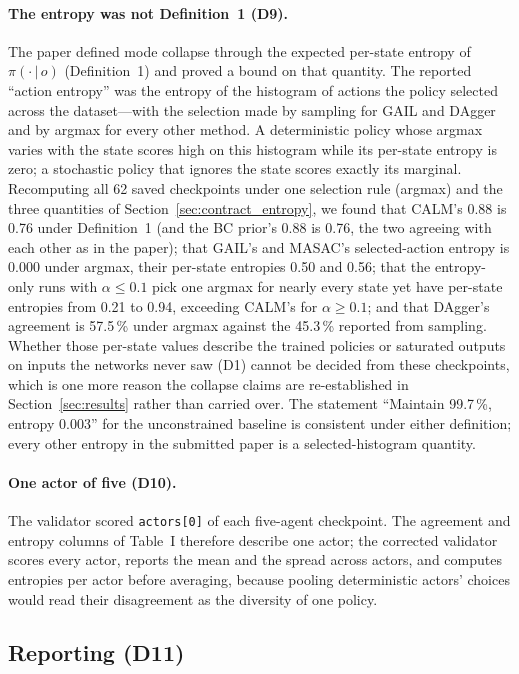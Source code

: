 \paragraph{The entropy was not Definition~1 (D9).}
The paper defined mode collapse through the expected per-state entropy of $\pi(\cdot\,|\,o)$ (Definition~1) and proved a bound on that quantity. The reported ``action entropy'' was the entropy of the histogram of actions the policy selected across the dataset---with the selection made by sampling for GAIL and DAgger and by argmax for every other method. A deterministic policy whose argmax varies with the state scores high on this histogram while its per-state entropy is zero; a stochastic policy that ignores the state scores exactly its marginal. Recomputing all 62 saved checkpoints under one selection rule (argmax) and the three quantities of Section~\ref{sec:contract_entropy}, we found that CALM's 0.88 is 0.76 under Definition~1 (and the BC prior's 0.88 is 0.76, the two agreeing with each other as in the paper); that GAIL's and MASAC's selected-action entropy is 0.000 under argmax, their per-state entropies 0.50 and 0.56; that the entropy-only runs with $\alpha\le0.1$ pick one argmax for nearly every state yet have per-state entropies from 0.21 to 0.94, exceeding CALM's for $\alpha\ge0.1$; and that DAgger's agreement is 57.5\,\% under argmax against the 45.3\,\% reported from sampling. Whether those per-state values describe the trained policies or saturated outputs on inputs the networks never saw (D1) cannot be decided from these checkpoints, which is one more reason the collapse claims are re-established in Section~\ref{sec:results} rather than carried over. The statement ``Maintain 99.7\,\%, entropy 0.003'' for the unconstrained baseline is consistent under either definition; every other entropy in the submitted paper is a selected-histogram quantity.

\paragraph{One actor of five (D10).}
The validator scored \texttt{actors[0]} of each five-agent checkpoint. The agreement and entropy columns of Table~I therefore describe one actor; the corrected validator scores every actor, reports the mean and the spread across actors, and computes entropies per actor before averaging, because pooling deterministic actors' choices would read their disagreement as the diversity of one policy.

\subsection{Reporting (D11)}
\label{sec:defects_reporting}

